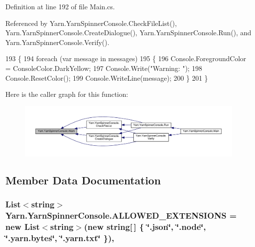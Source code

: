 Definition at line 192 of file Main.\-cs.



Referenced by Yarn.\-Yarn\-Spinner\-Console.\-Check\-File\-List(), Yarn.\-Yarn\-Spinner\-Console.\-Create\-Dialogue(), Yarn.\-Yarn\-Spinner\-Console.\-Run(), and Yarn.\-Yarn\-Spinner\-Console.\-Verify().


\begin{DoxyCode}
193         \{
194             \textcolor{keywordflow}{foreach} (var message \textcolor{keywordflow}{in} messages)
195             \{
196                 Console.ForegroundColor = ConsoleColor.DarkYellow;
197                 Console.Write(\textcolor{stringliteral}{"Warning: "});
198                 Console.ResetColor();
199                 Console.WriteLine(message);
200             \}
201         \}
\end{DoxyCode}


Here is the caller graph for this function\-:
\nopagebreak
\begin{figure}[H]
\begin{center}
\leavevmode
\includegraphics[width=350pt]{a00185_a979bb6f049b6c5294f745a19e24ddd9d_icgraph}
\end{center}
\end{figure}




\subsection{Member Data Documentation}
\hypertarget{a00185_a0979de7ea02c8c0375b8220a12e6575e}{
\subsubsection[{A\-L\-L\-O\-W\-E\-D\-\_\-\-E\-X\-T\-E\-N\-S\-I\-O\-N\-S}]{\setlength{\rightskip}{0pt plus 5cm}List$<$string$>$ Yarn.\-Yarn\-Spinner\-Console.\-A\-L\-L\-O\-W\-E\-D\-\_\-\-E\-X\-T\-E\-N\-S\-I\-O\-N\-S = new List$<$string$>$(new string\mbox{[}$\,$\mbox{]} \{ \char`\"{}.json\char`\"{}, \char`\"{}.node\char`\"{}, \char`\"{}.yarn.\-bytes\char`\"{}, \char`\"{}.yarn.\-txt\char`\"{} \})\hspace{0.3cm}{\ttfamily [static]}, {\ttfamily [package]}}}\label{a00185_a0979de7ea02c8c0375b8220a12e6575e}


